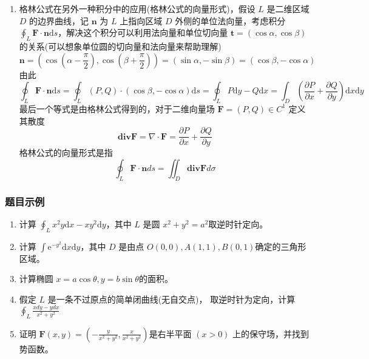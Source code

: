 \begin{enumerate}
    \item 格林公式在另外一种积分中的应用(格林公式的向量形式)，假设 $L$ 是二维区域 $D$ 的边界曲线，记 $\mathbf{n}$ 为 $L$ 上指向区域 $D$ 外侧的单位法向量，考虑积分 $\oint _L \mathbf{F} \cdot \mathbf{n} \mathrm{d}s$，解决这个积分可以利用法向量和单位切向量 $\mathbf{t} = (\cos \alpha, \cos \beta)$ 的关系(可以想象单位圆的切向量和法向量来帮助理解)
    \[
        \mathbf{n} = \left(\cos(\alpha-\frac{\pi}{2}),\cos(\beta+\frac{\pi}{2})\right)=(\sin\alpha,-\sin\beta)=(\cos\beta,-\cos\alpha)
    \]
    由此
    \[
        \oint _L \mathbf{F} \cdot \mathbf{n} \mathrm{d}s = \oint _L (P, Q) \cdot (\cos\beta,-\cos\alpha) \mathrm{d}s = \oint _L P \mathrm{d}y - Q \mathrm{d}x = \int _D \left(\frac{\partial P}{\partial x}+\frac{\partial Q}{\partial y}\right) \mathrm{d}x \mathrm{d}y
    \]
    最后一个等式是由格林公式得到的，对于二维向量场 $\mathbf{F} = (P,Q) \in C^1$ 定义其散度
    \[
        \mathbf{divF} = \nabla \cdot \mathbf{F} = \frac{\partial P}{\partial x}+\frac{\partial Q}{\partial y}
    \]
    格林公式的向量形式是指
    \[
    \oint_L\mathbf{F}\cdot\mathbf{n}ds=\iint_D\mathbf{div}\mathbf{F}d\sigma
    \]
\end{enumerate}

\subsubsection{题目示例}
\begin{enumerate}
    \item 计算 $\oint _L x^2y \mathrm{d}x -xy^2 \mathrm{d}y$，其中 $L$ 是圆 $x^2 + y^2 = a^2$取逆时针定向。

    \item 计算 $\int \mathrm{e} ^{-y^2} \mathrm{d}x \mathrm{d}y$，其中 $D$ 是由点 $O(0,0), A(1,1), B(0,1)$确定的三角形区域。

    \item 计算椭圆 $x = a \cos \theta , y = b \sin \theta $的面积。

    \item 假定 $L$ 是一条不过原点的简单闭曲线(无自交点)， 取逆时针为定向，计算 $\oint_L\frac{xdy-ydx}{x^2+y^2}$

    \item 证明 $\mathbf{F}(x,y) =\left(-\frac y{x^2+y^2},\frac x{x^2+y^2}\right) $是右半平面 $(x>0)$ 上的保守场，并找到势函数。
\end{enumerate}

